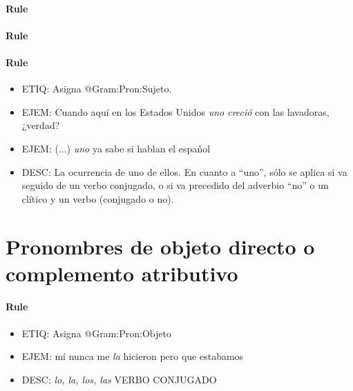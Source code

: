 \documentclass[11pt]{report}
\begin{document}
\paragraph*{Rule}
\paragraph*{Rule}
\paragraph*{Rule}
\begin{itemize}
\item ETIQ: Asigna @Gram:Pron:Sujeto.
\item EJEM: Cuando aquí en los Estados Unidos \emph{uno creció} con las lavadoras, ¿verdad? 
\item EJEM: (...) \emph{uno} ya sabe si hablan el español
\item DESC: La ocurrencia de uno de ellos. En cuanto a ``uno'', sólo se aplica si va seguido de un verbo conjugado, o si va precedido del adverbio ``no'' o un clítico y un verbo (conjugado o no).
\end{itemize}

\section{Pronombres de objeto directo o complemento atributivo}
\paragraph*{Rule}
\begin{itemize}
\item ETIQ: Asigna @Gram:Pron:Objeto
\item EJEM: mí nunca me \emph{la} hicieron pero que estabamos
\item DESC: \emph{lo, la, los, las} VERBO CONJUGADO
\end{itemize}
\end{document}
